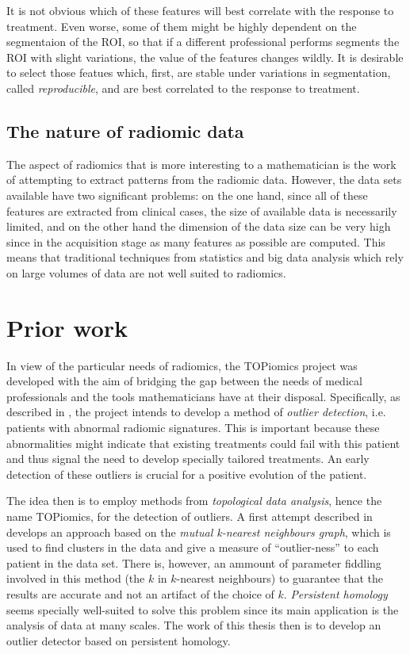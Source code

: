 \documentclass[../main.tex]{subfiles}
\begin{document}
It is not obvious which of these features will best correlate with the response to
treatment. Even worse, some of them might be highly dependent on the segmentaion of the
ROI, so that if a different professional performs segments the ROI with slight variations,
the value of the features changes wildly. It is desirable to select those featues which,
first, are stable under variations in segmentation, called \emph{reproducible}, and are
best correlated to the response to treatment. 

\subsection{The nature of radiomic data}
The aspect of radiomics that is more interesting to a mathematician is the work of
attempting to extract patterns from the radiomic data. However, the data sets available
have two significant problems: on the one hand, since all of these features are extracted
from clinical cases, the size of available data is necessarily limited, and on the other
hand the dimension of the data size can be very high since in the acquisition stage as
many features as possible are computed. This means that traditional techniques from
statistics and big data analysis which rely on large volumes of data are not well suited
to radiomics.

\section{Prior work} \label{sec:prior work}
In view of the particular needs of radiomics, the TOPiomics project was developed with the
aim of bridging the gap between the needs of medical professionals and the tools
mathematicians have at their disposal. Specifically, as described in \cite{topiomics,
attract}, the project intends to develop a method of \emph{outlier detection}, i.e.
patients with abnormal radiomic signatures. This is important because these abnormalities
might indicate that existing treatments could fail with this patient and thus signal the
need to develop specially tailored treatments. An early detection of these outliers is
crucial for a positive evolution of the patient. 

The idea then is to employ methods from \emph{topological data analysis}, hence the name
TOPiomics, for the detection of outliers. A first attempt described in \cite{outliers}
develops an approach based on the \emph{mutual k-nearest neighbours graph}, which is used
to find clusters in the data and give a measure of ``outlier-ness'' to each patient in the
data set. There is, however, an ammount of parameter fiddling involved in this method (the
\( k \) in \( k \)-nearest neighbours) to guarantee that the results are accurate and not
an artifact of the choice of \( k \). \emph{Persistent homology} seems specially
well-suited to solve this problem since its main application is the analysis of data at
many scales. The work of this thesis then is to develop an outlier detector based on
persistent homology. 
\end{document}
